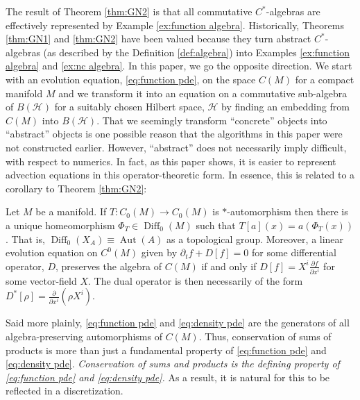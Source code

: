 \documentclass[final,leqno]{siamart}
\newcommand{\pder}[2]{\ensuremath{\frac{ \partial #1}{\partial #2}}}
\DeclareMathOperator{\Diff}{Diff}
\begin{document}
The result of Theorem \ref{thm:GN2} is that all commutative $C^{*}$-algebras are effectively represented by Example \ref{ex:function algebra}.
Historically, Theorems \ref{thm:GN1} and \ref{thm:GN2} have been valued because they turn abstract $C^{*}$-algebras
(as described by the Definition \ref{def:algebra}) into Examples \ref{ex:function algebra} and \ref{ex:nc algebra}.
In this paper, we go the opposite direction.
We start with an evolution equation, \eqref{eq:function pde}, on the space $C(M)$ for a compact manifold $M$ and we transform it into an equation on a commutative sub-algebra of $B(\mathcal{H})$
for a suitably chosen Hilbert space, $\mathcal{H}$ by finding an embedding from $C(M)$ into $B(\mathcal{H})$.
That we seemingly transform ``concrete'' objects into ``abstract'' objects is one possible reason that the algorithms in this paper were not constructed earlier.
However, ``abstract'' does not necessarily imply difficult, with respect to numerics.
In fact, as this paper shows, it is easier to represent advection equations in this operator-theoretic form.
In essence, this is related to a corollary to Theorem \ref{thm:GN2}:

\begin{corollary}
	Let $M$ be a manifold.
	If $T: C_{0}(M) \to C_{0}(M)$ is $*$-automorphism then there is a unique homeomorphism $\Phi_{T} \in \Diff_{0}(M)$ such that $T[a](x) = a( \Phi_{T}(x) )$.
	That is, $\Diff_{0}(X_{A}) \equiv \operatorname{Aut}(A)$ as a topological group.
	Moreover, a linear evolution equation on $C^{0}(M)$ given by $\partial_{t} f + D[f] = 0$ for some differential operator, $D$,
	preserves  the algebra of $C(M)$ if and only if $D[f] = X^{i} \pder{f}{x^{i}}$ for some vector-field $X$.
	The dual operator is then necessarily of the form $D^{*}[\rho] = \pder{}{x^{i}}( \rho X^{i})$.
\end{corollary}

Said more plainly, \eqref{eq:function pde} and \eqref{eq:density pde} are the generators of all algebra-preserving automorphisms of $C(M)$.
Thus, conservation of sums of products is more than just a fundamental property of \eqref{eq:function pde} and \eqref{eq:density pde}.
\emph{Conservation of sums and products is the defining property of  \eqref{eq:function pde} and \eqref{eq:density pde}.}
As a result, it is natural for this to be reflected in a discretization.
\end{document}

